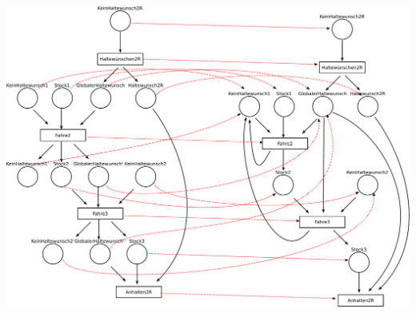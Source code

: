 \documentclass{scrreprt}
\begin{document}
\begin{enumerate}
\begin{center}
  \includegraphics[width=1\textwidth]{prozess-morph.pdf}
\end{center}

\end{enumerate}
\end{document}
